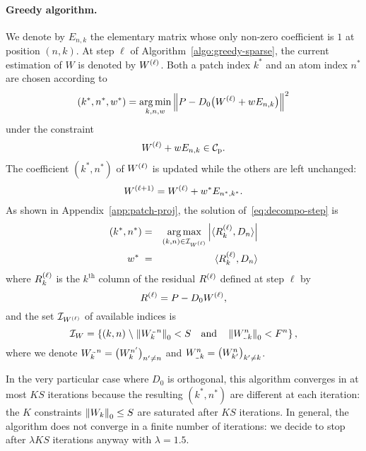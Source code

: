 \paragraph{Greedy algorithm.}

We denote by $E_{n,k}$ the elementary matrix whose only non-zero coefficient is $1$ at position $(n,k)$.
At step $\ell$ of Algorithm~\ref{algo:greedy-sparse}, the current estimation of $W$ is denoted by $W^{\left(\ell\right)}$.
Both a patch index $k^*$ and an atom index $n^*$ are chosen according to
\begin{equation}
  \label{eq:decompo-step}
  (k^*,n^*,w^*) = \operatorname*{arg\,min}_{k,n,w}
    \left\|P-D_0 \big(W^{\left(\ell\right)} + w E_{n,k}\big)\right\|^2
\end{equation}
under the constraint
\begin{equation}
  W^{\left(\ell\right)} + wE_{n,k} \in {\mathcal{C}_{\mathrm{p}}}.
\end{equation}
The coefficient $(k^*,n^*)$ of $W^{\left(\ell\right)}$ is updated while the others are left unchanged:
\begin{equation}
  \label{eq:decompo-next-w}
  W^{\left(\ell+1\right)} = W^{\left(\ell\right)} + w^* E_{n^*,k^*}.
\end{equation}
As shown in Appendix~\ref{app:patch-proj}, the solution of~\eqref{eq:decompo-step} is
\begin{eqnarray}
  \label{eq:decompo-kn}
  (k^*,n^*) &=& \operatorname*{arg\,max}_{(k,n)\in\mathcal{I}_{W^{\left(\ell\right)}}} {\left|\langle R_k^{\left(\ell\right)},D_n \rangle\right|} \\
  \label{eq:decompo-w}
  w^* \;    &=& \; \langle R_k^{\left(\ell\right)},D_n \rangle
\end{eqnarray}
where $R_k^{\left(\ell\right)}$ is the $k^\text{th}$ column of the residual $R^{\left(\ell\right)}$ defined at step $\ell$ by
\begin{equation}
  \label{eq:residual}
  R^{\left(\ell\right)} = P - D_0 W^{\left(\ell\right)},
\end{equation}
and the set $\mathcal{I}_{W^{\left(\ell\right)}}$ of available indices is
\begin{equation}
  \label{eq:decompo-support}
  \mathcal{I}_W=\setof{
    (k,n)\suchthat
    \norm{W_k^{\except n}}_0 <S \quad\text{and}\quad
    \norm{W_{\except k}^n}_0 <F^n
  },
\end{equation}
where we denote $W_k^{\except n} = \big(W_k^{n'}\big)_{n'\neq n}$ and $W_{\except k}^n = \big(W_{k'}^n\big)_{k'\neq k}$.

In the very particular case where $D_0$ is orthogonal, this algorithm converges in at most $KS$ iterations because the resulting $(k^*,n^*)$ are different at each iteration: the $K$ constraints $\left\|W_k\right\|_0 \leq S$ are saturated after $KS$ iterations.
In general, the algorithm does not converge in a finite number of iterations: we decide to stop after $\lambda KS$ iterations anyway with $\lambda=1.5$.


